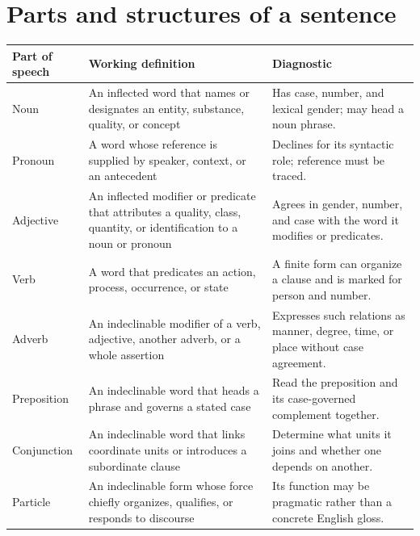 
\section{Parts and structures of a sentence}


\begin{xltabular}{\linewidth}{@{}P{1.1in}P{2.25in}Y@{}}
  \toprule
  \textbf{Part of speech} & \textbf{Working definition} & \textbf{Diagnostic} \\
  \midrule\endhead
  Noun & An inflected word that names or designates an entity, substance,
       quality, or concept & Has case, number, and lexical gender; may head a
       noun phrase. \\
  Pronoun & A word whose reference is supplied by speaker, context, or an
       antecedent & Declines for its syntactic role; reference must be traced. \\
  Adjective & An inflected modifier or predicate that attributes a quality,
       class, quantity, or identification to a noun or pronoun & Agrees in
       gender, number, and case with the word it modifies or predicates. \\
  Verb & A word that predicates an action, process, occurrence, or state & A
       finite form can organize a clause and is marked for person and number. \\
  Adverb & An indeclinable modifier of a verb, adjective, another adverb, or a
       whole assertion & Expresses such relations as manner, degree, time, or
       place without case agreement. \\
  Preposition & An indeclinable word that heads a phrase and governs a stated
       case & Read the preposition and its case-governed complement together. \\
  Conjunction & An indeclinable word that links coordinate units or introduces
       a subordinate clause & Determine what units it joins and whether one
       depends on another. \\
  Particle & An indeclinable form whose force chiefly organizes, qualifies, or
       responds to discourse & Its function may be pragmatic rather than a
       concrete English gloss. \\
  \bottomrule
\end{xltabular}

